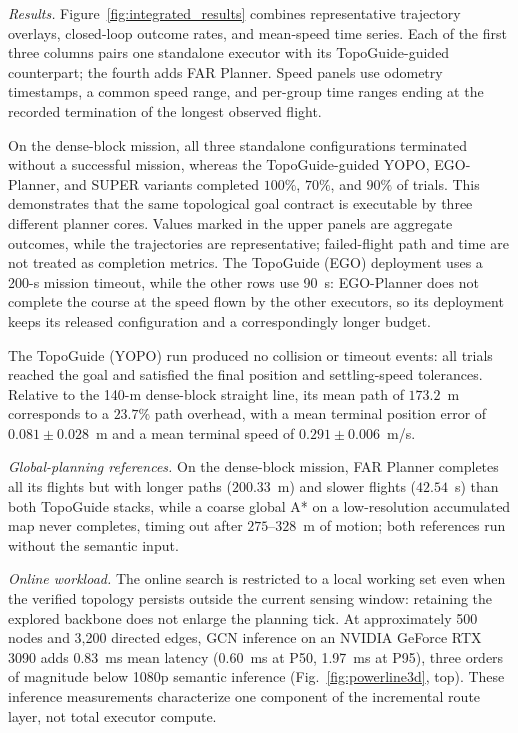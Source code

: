 \documentclass[letterpaper,10pt,conference]{ieeeconf}
\begin{document}
\emph{Results.}  Figure~\ref{fig:integrated_results} combines representative trajectory
overlays, closed-loop outcome rates, and mean-speed time series.  Each
of the first three columns pairs one standalone executor with its
TopoGuide-guided counterpart; the fourth adds FAR Planner.  Speed
panels use odometry timestamps, a common speed range, and per-group
time ranges ending at the recorded termination of the longest observed
flight.

On the dense-block mission, all three standalone configurations
terminated without a successful mission, whereas
the TopoGuide-guided YOPO, EGO-Planner, and SUPER variants completed $100\%$,
$70\%$, and $90\%$ of trials.  This demonstrates that the same topological goal
contract is executable by three different planner cores.  Values marked
in the upper panels are aggregate outcomes, while the trajectories are
representative; failed-flight path and time are not treated as completion
metrics.  The TopoGuide (EGO)
deployment uses a 200-s mission timeout, while the other rows use 90~s:
EGO-Planner does not complete the course at the speed flown by the other
executors, so its deployment keeps its released configuration and a
correspondingly longer budget.

The TopoGuide (YOPO) run produced no collision or timeout events: all trials
reached the goal and satisfied the final position and settling-speed
tolerances.  Relative to the 140-m dense-block straight line, its mean path of
$173.2$~m corresponds to a $23.7\%$ path overhead, with a mean terminal
position error of $0.081\pm0.028$~m and a mean terminal speed of
$0.291\pm0.006$~m/s.

\emph{Global-planning references.}  On the dense-block
mission, FAR Planner \cite{farplanner} completes all its flights but with
longer paths ($200.33$~m) and slower flights ($42.54$~s) than both
TopoGuide stacks, while a coarse global A* on a low-resolution accumulated
map never completes, timing out after $275$--$328$~m of motion; both
references run without the semantic input.

\emph{Online workload.}  The online search is restricted to a local working
set even when the verified topology persists outside the current sensing
window: retaining the explored backbone does not enlarge the planning tick.
At
approximately 500 nodes and 3,200 directed edges, GCN inference on an
NVIDIA GeForce RTX 3090 adds 0.83~ms mean latency (0.60~ms at P50, 1.97~ms
at P95), three orders of magnitude below 1080p semantic inference
(Fig.~\ref{fig:powerline3d}, top).  These inference measurements
characterize one component of the incremental route layer, not total
executor compute.
\end{document}
